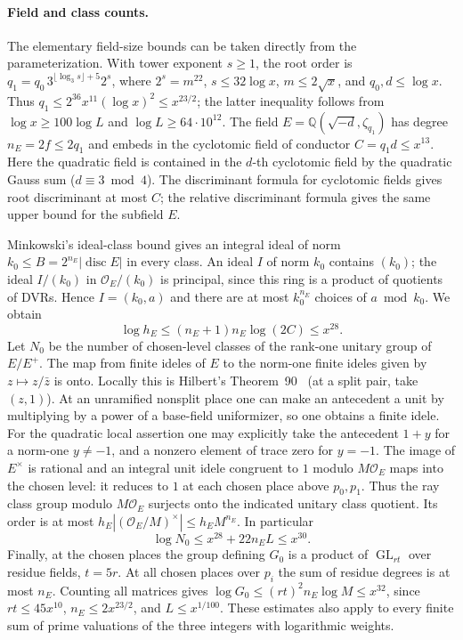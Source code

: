 \paragraph{Field and class counts.}
The elementary field-size bounds can be taken directly from the
parameterization. With tower exponent \(s\ge1\), the root order is
\(q_1=q_0\,3^{\lfloor\log_3s\rfloor+5}2^s\), where \(2^s=m^{22}\),
\(s\le32\log x\), \(m\le2\sqrt{x}\), and \(q_0,d\le\log x\).
Thus \(q_1\le 2^{36}x^{11}(\log x)^2\le x^{23/2}\); the latter
inequality follows from \(\log x\ge100\log L\) and
\(\log L\ge64\cdot10^{12}\).
The field \(E=\mathbb Q(\sqrt{-d},\zeta_{q_1})\) has
degree \(n_E=2f\le2q_1\) and embeds in the cyclotomic field of
conductor \(C=q_1d\le x^{13}\). Here the quadratic field is contained
in the \(d\)-th cyclotomic field by the quadratic Gauss sum
(\(d\equiv3\bmod4\)). The discriminant formula for cyclotomic fields
gives root discriminant at most \(C\); the relative discriminant
formula gives the same upper bound for the subfield \(E\).

Minkowski's ideal-class bound gives an integral ideal of norm
\(k_0\le B=2^{n_E}|\operatorname{disc}E|\) in every class.
An ideal \(I\) of norm \(k_0\) contains \((k_0)\); the ideal
\(I/(k_0)\) in \(\mathcal O_E/(k_0)\) is principal, since this
ring is a product of quotients of DVRs. Hence \(I=(k_0,a)\) and
there are at most \(k_0^{n_E}\) choices of \(a\bmod k_0\). We obtain
\[
 \log h_E\le(n_E+1)n_E\log(2C)\le x^{28}.
\]
Let \(N_0\) be the number of chosen-level classes of the rank-one
unitary group of \(E/E^+\). The map from finite ideles of \(E\)
to the norm-one finite ideles given by \(z\mapsto z/\bar z\) is
onto. Locally this is Hilbert's Theorem~90~\cite[II, Corollary~1.23]{milneCFT} (at a split pair, take
\((z,1)\)). At an unramified nonsplit place one can make an antecedent
a unit by multiplying by a power of a base-field uniformizer,
so one obtains a finite idele. For the quadratic local assertion
one may explicitly take the antecedent \(1+y\) for a norm-one
\(y\ne-1\), and a nonzero element of trace zero for \(y=-1\).
The image of \(E^\times\) is rational and an integral unit idele
congruent to \(1\) modulo \(M\mathcal O_E\) maps into the chosen
level: it reduces to \(1\) at each chosen place above \(p_0,p_1\).
Thus the ray class group modulo \(M\mathcal O_E\) surjects onto
the indicated unitary class quotient. Its order is at most
\(h_E|(\mathcal O_E/M)^\times|\le h_E M^{n_E}\). In particular
\[
 \log N_0\le x^{28}+22 n_E L\le x^{30}.
\]
Finally, at the chosen places the group defining \(G_0\) is a
product of \(\operatorname{GL}_{rt}\) over residue fields,
\(t=5r\). At all chosen places over \(p_i\) the sum of residue
degrees is at most \(n_E\). Counting all matrices gives
\(\log G_0\le (rt)^2 n_E\log M\le x^{32}\), since
\(rt\le45x^{10}\), \(n_E\le2x^{23/2}\), and \(L\le x^{1/100}\).
These estimates also apply to every finite sum of prime valuations
of the three integers with logarithmic weights.

